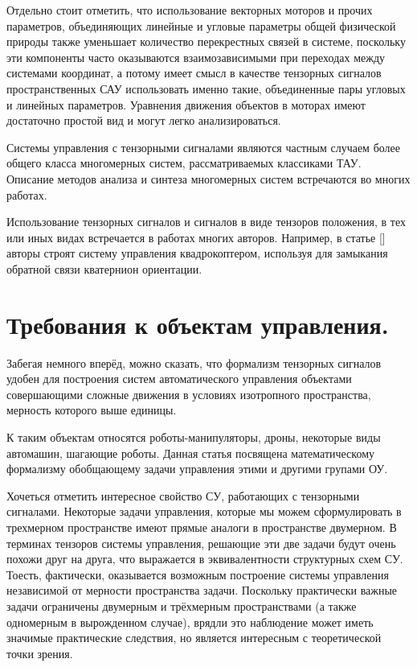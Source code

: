 \documentclass[a4paper]{article}
\begin{document}
Отдельно стоит отметить, что использование векторных моторов и прочих параметров, объединяющих линейные и угловые параметры общей физической природы также уменьшает количество перекрестных связей в системе, поскольку эти компоненты часто оказываются взаимозависимыми при переходах между системами координат, а потому имеет смысл в качестве тензорных сигналов пространственных САУ использовать именно такие, объединенные пары угловых и линейных параметров. Уравнения движения объектов в моторах имеют достаточно простой вид и могут легко анализироваться.

Системы управления с тензорными сигналами являются частным случаем более общего класса многомерных систем, рассматриваемых классиками ТАУ. Описание методов анализа и синтеза многомерных систем встречаются во многих работах. 

Использование тензорных сигналов и сигналов в виде тензоров положения, в тех или иных видах встречается в работах многих авторов. Например, в статье [] авторы строят систему управления квадрокоптером, используя для замыкания обратной связи кватернион ориентации. 

\section{Требования к объектам управления.}
Забегая немного вперёд, можно сказать, что формализм тензорных сигналов удобен для построения систем автоматического управления объектами совершающими сложные движения в условиях изотропного пространства, мерность которого выше единицы.

К таким объектам относятся роботы-манипуляторы, дроны, некоторые виды автомашин, шагающие роботы. 
Данная статья посвящена математическому формализму обобщающему задачи управления этими и другими групами ОУ.

Хочеться отметить интересное свойство СУ, работающих с тензорными сигналами. Некоторые задачи управления, которые мы можем сформулировать в трехмерном пространстве имеют прямые аналоги в пространстве двумерном. В терминах тензоров системы управления, решающие эти две задачи будут очень похожи друг на друга, что выражается в эквивалентности структурных схем СУ. Тоесть, фактически, оказывается возможным построение системы управления независимой от мерности пространства задачи. Поскольку практически важные задачи ограничены двумерным и трёхмерным пространствами (а также одномерным в вырожденном случае), врядли это наблюдение может иметь значимые практические следствия, но является интересным с теоретической точки зрения. 
\end{document}

